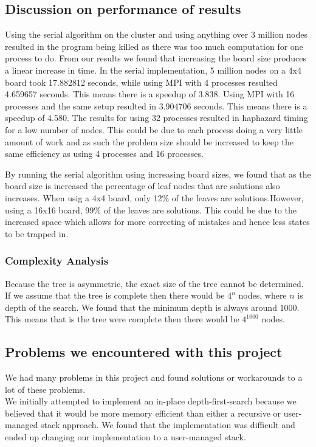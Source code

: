 \documentclass[a4paper]{report}
\begin{document}
\subsection{Discussion on performance of results}
Using the serial algorithm on the cluster and using anything over 3 million nodes resulted in the program being killed as there was too much computation for one process to do. From our results we found that increasing the board size produces a linear increase in time. In the serial implementation, 5 million nodes on a 4x4 board took 17.882812 seconds, while using MPI with 4 processes resulted 4.659657 seconds. This means there is a speedup of 3.838. Using MPI with 16 processes and the same setup resulted in 3.904706 seconds. This means there is a speedup of 4.580.
The results for using 32 processes resulted in haphazard timing for a low number of nodes. This could be due to each process doing a very little amount of work and as such the problem size should be increased to keep the same efficiency as using 4 processes and 16 processes. 

By running the serial algorithm using increasing board sizes, we found that as the board size is increased the percentage of leaf nodes that are solutions also increases. When usig a 4x4 board, only 12\% of the leaves are solutions.However, using a 16x16 board, 99\% of the leaves are solutions. This could be due to the increased space which allows for more correcting of mistakes and hence less states to be trapped in.

\subsubsection{Complexity Analysis}
Because the tree is asymmetric, the exact size of the tree cannot be determined. If we assume that the tree is complete then there would be $4^n$ nodes, where $n$ is depth of the search. We found that the minimum depth is always around 1000. This means that is the tree were complete then there would be $4^1000$ nodes. 

\subsection{Problems we encountered with this project}
We had many problems in this project and found solutions or workarounds to a lot of these problems.\\

We initially attempted to implement an in-place depth-first-search because we believed that it would be more memory efficient than either a recursive or user-managed stack approach. We found that the implementation was difficult and ended up changing our implementation to a user-managed stack.\\
\end{document}
